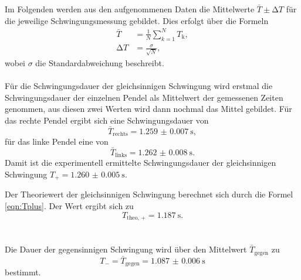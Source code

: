   \noindent Im Folgenden werden aus den aufgenommenen Daten die Mittelwerte $\bar{T} \pm \increment T$ für die jeweilige Schwingungsmessung gebildet. 
  Dies erfolgt über die Formeln
  \begin{align}  
    \bar{T} &= \frac{1}{N} \sum_{k=1}^{N} T_{\text{k}}, \label{eqn:mittel}\\
    \increment T &= \frac{\sigma}{\sqrt{N}} , \label{eqn:fehlermittel} 
  \end{align}
  wobei $\sigma$ die Standardabweichung beschreibt. \\ \\

  \noindent Für die Schwingungsdauer der gleichsinnigen Schwingung wird erstmal die Schwingungsdauer der einzelnen Pendel als Mittelwert der gemessenen Zeiten
  genommen, aus diesen zwei Werten wird dann nochmal das Mittel gebildet. Für das rechte Pendel ergibt sich eine Schwingungsdauer von 
  \begin{equation*}
    \bar{T}_{\text{rechts}} = \SI{1.259(7)}{\second}, 
  \end{equation*}
  für das linke Pendel eine von 
  \begin{equation*}
    \bar{T}_{\text{links}} = \SI{1.262(8)}{\second}. 
  \end{equation*}
  Damit ist die experimentell ermittelte Schwingungsdauer der gleichsinnigen Schwingung $ T_{+} = \SI{1.260(5)}{\second}$. 
  
  \noindent Der Theoriewert der gleichsinnigen Schwingung berechnet sich durch die Formel \eqref{eqn:Tplus}. Der Wert ergibt sich zu 
  \begin{equation*}
    T_{\text{theo, +}} = \SI{1.187}{\second}.
  \end{equation*} \\ \\

  \noindent Die Dauer der gegensinnigen Schwingung wird über den Mittelwert $\bar{T}_{\text{gegen}}$ zu 
  \begin{equation*}
    T_{-} = \bar{T}_{\text{gegen}} = \SI{1.087(6)}{\second}
  \end{equation*} 
  bestimmt.

